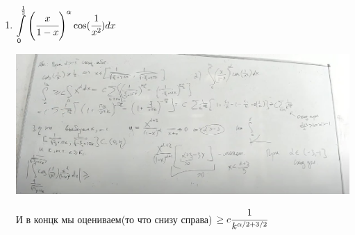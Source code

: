 \begin{enumerate}
    \item $\displaystyle\int\limits_{0}^{\frac{1}{2}}\left ( \cfrac{x}{1-x}\right)^{\alpha} \cos (\cfrac{1}{x^2})dx$

     \begin{center}
        \includegraphics[width = 17cm]{assets/10_2.jpg}
    \end{center}

    И в концк мы оцениваем(то что снизу справа) $\geq c \cfrac{1}{k^{\alpha/2+3/2}}$
    
\end{enumerate}